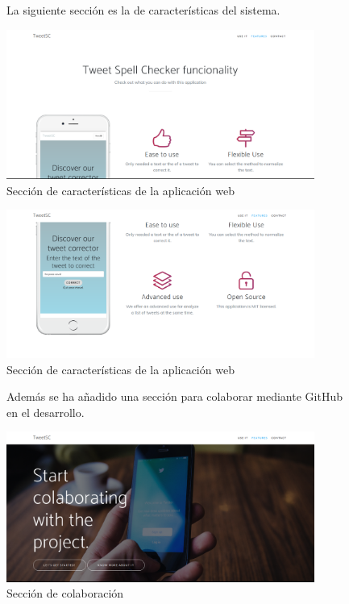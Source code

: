 \documentclass[spanish,12pt, a4paper,twoside]{paper}
\begin{document}
\begin{figure}[h]
La siguiente sección es la de características del sistema.
\begin{center}
 \includegraphics[width=0.9\textwidth]{recursos/WebFeatures1}
\caption{Sección de características de la aplicación web}
\label{fig:webfeatures1}
\end{center}
\end{figure}

\begin{figure}[h]
\centering
 \includegraphics[width=0.9\textwidth]{recursos/WebFeatures2}
\caption{Sección de características de la aplicación web}
\label{fig:webfeatures2}
\end{figure}

\begin{figure}[h]
Además se ha añadido una sección para colaborar mediante GitHub en el desarrollo.
\begin{center}
 \includegraphics[width=0.9\textwidth]{recursos/WebColaborate}
\caption{Sección de colaboración}
\label{fig:webcolaborate}
\end{center}
\end{figure}
\end{document}
